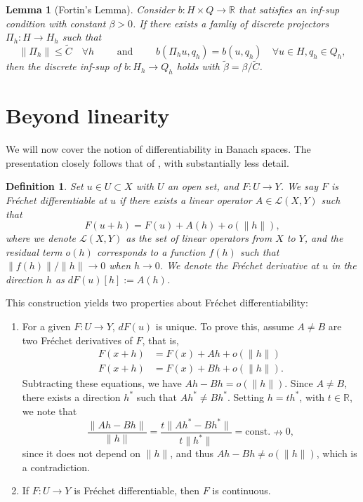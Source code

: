 \documentclass{article}
\newtheorem{definition}{Definition}
\newcommand{\R}{\mathbb{R}}
\newtheorem{lemma}{Lemma}
\begin{document}
\begin{lemma}[Fortin's Lemma]
Consider $b:H\times Q\to \R$ that satisfies an inf-sup condition with constant $\beta >0$. If there exists a famliy of discrete projectors $\Pi_h: H\to H_h$ such that 
    \[ \|\Pi_h \|\leq \tilde C \quad \forall h \qquad \text{ and } \qquad b(\Pi_h u, q_h) = b(u, q_h) \quad\forall u\in H, q_h \in Q_h,\]
then the discrete inf-sup of $b:H_h\to Q_h$ holds with $\tilde \beta = \beta / \tilde C$.
\end{lemma}

\section{Beyond linearity}
We will now cover the notion of differentiability in Banach spaces. The presentation closely follows that of \cite{ambrosetti1995primer}, with substantially less detail.
\begin{definition}
    Set $u\in U \subset X$ with $U$ an open set, and $F:U\to Y$. We say $F$ is Fréchet differentiable at $u$ if there exists a linear operator $A\in\mathcal{L}(X,Y)$ such that
    \begin{equation*}
        F(u+h)=F(u)+A(h)+o(\|h\|),
    \end{equation*}
    where we denote $\mathcal{L}(X,Y)$ as the set of linear operators from $X$ to $Y$, and the residual term $o(h)$ corresponds to a function $f(h)$ such that $\|f(h)\|/\|h\| \to 0$ when $h\to 0$. We denote the Fréchet derivative at $u$ in the direction $h$ as $dF(u)[h] := A(h)$.
\end{definition}
This construction yields two properties about Fréchet differentiability:
\begin{enumerate}
    \item For a given $F:U\to Y$, $dF(u)$ is unique. To prove this, assume $A\neq B$ are two Fréchet derivatives of $F$, that is, 
    \begin{align*}
        F(x+h) &= F(x) + Ah + o(\|h\|) \\
        F(x+h) &= F(x) + Bh + o(\|h\|).
    \end{align*}
    Subtracting these equations, we have $Ah - Bh = o(\|h\|)$. Since $A\neq B$, there exists a direction $h^*$ such that $Ah^* \neq Bh^*$. Setting $h=th^*$, with $t\in \mathbb{R}$, we note that
    \begin{equation*}
        \frac{\|Ah-Bh\|}{\|h\|} = \frac{t\|Ah^*-Bh^*\|}{t\|h^*\|} = \text{const.} \nrightarrow 0,
    \end{equation*}
    since it does not depend on $\|h\|$, and thus $Ah - Bh \neq o(\|h\|)$, which is a contradiction. 
    \item If $F:U\to Y$ is Fréchet differentiable, then $F$ is continuous.
\end{enumerate}
\end{document}
